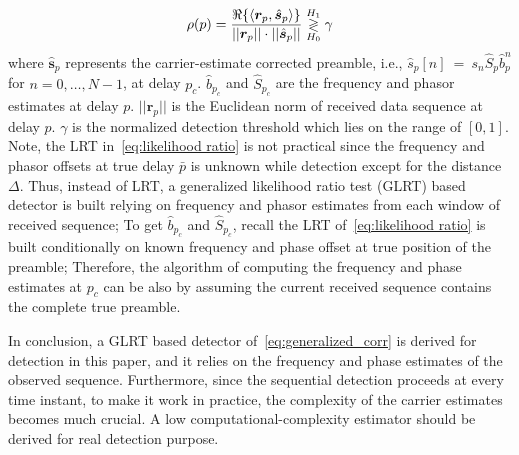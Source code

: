 \begin{equation}
    \label{eq:generalized_corr}
    \rho(p)=
    \frac{\Re\{\langle
      \bm{r}_{p},\hat{\bm{s}}_{p}\rangle\}}
    {||\bm{r}_{p}||\cdot||\hat{\bm{s}}_{p}||} \mathrel{\mathop\gtrless\limits^{H_1}_{H_0}} \gamma
  \end{equation}
where $\hat{\bm{s}}_{p}$ represents the carrier-estimate corrected preamble, i.e., $\hat{s}_{p}[n]~{=}~s_{n}\hat{S}_{p}\hat{b}_{p}^n$ for $n=0,\ldots,N{-}1$,
at delay $p_c$. $\hat{b}_{p_c}$ and $\hat{S}_{p_c}$ are the frequency and phasor estimates at delay $p$.
$||\bm{r}_{p}||$ is the Euclidean norm of received data sequence at delay $p$.
$\gamma$ is the normalized detection threshold which lies on the range of $[0,1]$.
Note, the LRT in~\eqref{eq:likelihood ratio} is not practical since the frequency and phasor offsets at true delay $\bar{p}$
is unknown while detection except for the distance $\Delta$. 
Thus, instead of LRT, a generalized likelihood ratio test (GLRT) based detector is built relying on frequency and phasor estimates from each window of received sequence;
To get $\hat{b}_{p_c}$ and $\hat{S}_{p_c}$,
recall the LRT of~\eqref{eq:likelihood ratio} is built conditionally on known frequency and phase offset 
at true position of the preamble; Therefore, the algorithm of computing the frequency and phase estimates at $p_c$ 
can be also by assuming the current received sequence contains the complete true preamble.

In conclusion, a GLRT based detector of~\eqref{eq:generalized_corr} is derived for detection in this paper, and it relies on the frequency and phase estimates of the observed sequence.
Furthermore, since the sequential detection proceeds at every time instant, to make it work in practice, the complexity of the carrier estimates becomes
much crucial. A low computational-complexity estimator should be derived for real detection purpose.








